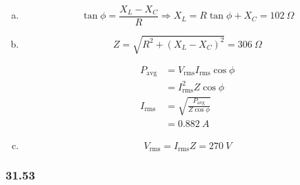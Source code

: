 \documentclass{article}
\begin{document}
\begin{enumerate}[(a)]
  \item \[\tan \phi = \frac{X_L - X_C}{R} \Rightarrow X_L = R \tan \phi + X_C = \qty{102}{\Omega}\]

  \item

        \[Z = \sqrt{R^2 + (X_L - X_C)^2} = \qty{306}{\Omega}\]

        \begin{align*}
          P_\text{avg} & = V_\text{rms} I_\text{rms} \cos \phi     \\
                       & = I_\text{rms}^2 Z \cos \phi              \\
          I_\text{rms} & = \sqrt{\frac{P_\text{avg}}{Z \cos \phi}} \\
                       & = \qty{0.882}{A}
        \end{align*}

  \item \[V_\text{rms} = I_\text{rms} Z = \qty{270}{V}\]
\end{enumerate}

\subsubsection{31.53}
\end{document}
